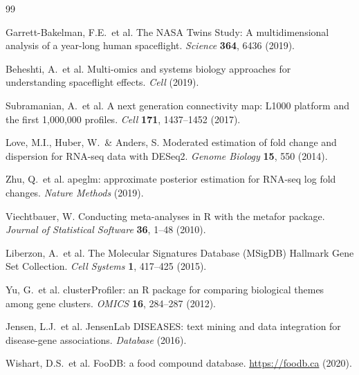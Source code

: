 \documentclass[11pt,a4paper]{article}
\begin{document}
\begin{thebibliography}{99}

Garrett-Bakelman, F.E.\ et al. The NASA Twins Study: A multidimensional analysis of a year-long 
human spaceflight. \textit{Science} \textbf{364}, 6436 (2019).

Beheshti, A.\ et al. Multi-omics and systems biology approaches for understanding spaceflight 
effects. \textit{Cell} (2019).

Subramanian, A.\ et al. A next generation connectivity map: L1000 platform and the first 
1,000,000 profiles. \textit{Cell} \textbf{171}, 1437--1452 (2017).

Love, M.I., Huber, W.\ \& Anders, S. Moderated estimation of fold change and dispersion for 
RNA-seq data with DESeq2. \textit{Genome Biology} \textbf{15}, 550 (2014).

Zhu, Q.\ et al. apeglm: approximate posterior estimation for RNA-seq log fold changes. 
\textit{Nature Methods} (2019).

Viechtbauer, W. Conducting meta-analyses in R with the metafor package. \textit{Journal of 
Statistical Software} \textbf{36}, 1--48 (2010).

Liberzon, A.\ et al. The Molecular Signatures Database (MSigDB) Hallmark Gene Set Collection. 
\textit{Cell Systems} \textbf{1}, 417--425 (2015).

Yu, G.\ et al. clusterProfiler: an R package for comparing biological themes among gene clusters. 
\textit{OMICS} \textbf{16}, 284--287 (2012).

Jensen, L.J.\ et al. JensenLab DISEASES: text mining and data integration for disease-gene 
associations. \textit{Database} (2016).

Wishart, D.S.\ et al. FooDB: a food compound database. \url{https://foodb.ca} (2020).

\end{thebibliography}
\end{document}
